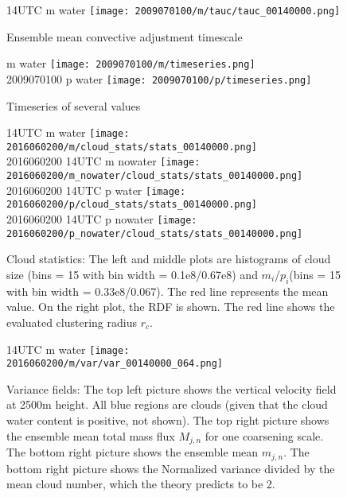 \documentclass[a4paper, 12pt, draft]{article}
\begin{document}
\begin{figure}[ht] \label{fig:case1_tau_c}
\noindent {} 14UTC m water
\texttt{[image: 2009070100/m/tauc/tauc\_00140000.png]}\\
\caption{Ensemble mean convective adjustment timescale}
\end{figure}

\begin{figure}[ht] \label{fig:case1_timeseries}
\noindent {} m water
\texttt{[image: 2009070100/m/timeseries.png]}\\
2009070100 p water
\texttt{[image: 2009070100/p/timeseries.png]}\\
\caption{Timeseries of several values}
\end{figure}



\begin{figure}[ht] \label{fig:case1_stats}
\noindent {} 14UTC m water
\texttt{[image: 2016060200/m/cloud\_stats/stats\_00140000.png]}\\
2016060200 14UTC m nowater
\texttt{[image: 2016060200/m\_nowater/cloud\_stats/stats\_00140000.png]}\\
2016060200 14UTC p water
\texttt{[image: 2016060200/p/cloud\_stats/stats\_00140000.png]}\\
2016060200 14UTC p nowater
\texttt{[image: 2016060200/p\_nowater/cloud\_stats/stats\_00140000.png]}\\
\caption{Cloud statistics: The left and middle plots are histograms of cloud size (bins = 15 with bin width = 0.1e8/0.67e8) and $m_i$/$p_i$(bins = 15 with bin width = 0.33e8/0.067). The red line represents the mean value. On the right plot, the RDF is shown. The red line shows the evaluated clustering radius $r_c$.}
\end{figure}

\begin{figure}[ht] \label{fig:case1_var_fields}
\noindent {} 14UTC m water
\texttt{[image: 2016060200/m/var/var\_00140000\_064.png]}\\
\caption{Variance fields:  The top left picture shows the vertical velocity field at 2500m height. All blue regions are clouds (given that the cloud water content is positive, not shown). The top right picture shows the ensemble mean total mass flux $M_{j,n}$ for one coarsening scale. The bottom right picture shows the ensemble mean $m_{j,n}$. The bottom right picture shows the Normalized variance divided by the mean cloud number, which the theory predicts to be 2.}
\end{figure}
\end{document}
